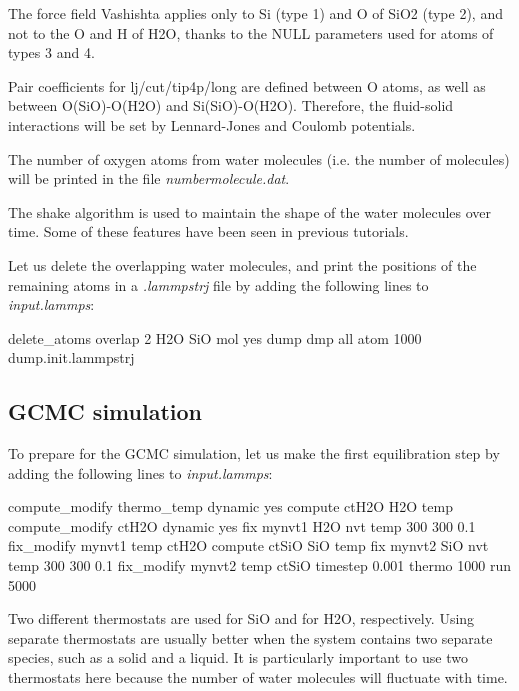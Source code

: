 \noindent The force field Vashishta applies only to Si (type 1)
and O of SiO2 (type 2),
and not to the O and H of H2O, thanks to the NULL
parameters used for atoms of types 3 and 4. 

\vspace{0.25cm} \noindent Pair coefficients for lj/cut/tip4p/long are
defined between O atoms, as well as between
O(SiO)-O(H2O) and Si(SiO)-O(H2O). Therefore, the fluid-solid 
interactions will be set by Lennard-Jones and Coulomb potentials. 

\vspace{0.25cm} \noindent The number of oxygen atoms from water molecules (i.e. the number of molecules)
will be printed in the file \textit{numbermolecule.dat}.

\vspace{0.25cm} \noindent The shake algorithm is used to
maintain the shape of the water molecules over time. Some of
these features have been seen in previous tutorials.

\vspace{0.25cm} \noindent Let us delete the overlapping water molecules, and print the
positions of the remaining atoms in a \textit{.lammpstrj} file by adding the following
lines to \textit{input.lammps}:

\begin{lcverbatim}
delete_atoms overlap 2 H2O SiO mol yes
dump dmp all atom 1000 dump.init.lammpstrj
\end{lcverbatim}

\subsection{GCMC simulation}
To prepare for the GCMC simulation,
let us make the first equilibration step
by adding the following lines to \textit{input.lammps}:

\begin{lcverbatim}
compute_modify thermo_temp dynamic yes
compute ctH2O H2O temp
compute_modify ctH2O dynamic yes
fix mynvt1 H2O nvt temp 300 300 0.1
fix_modify mynvt1 temp ctH2O
compute ctSiO SiO temp
fix mynvt2 SiO nvt temp 300 300 0.1
fix_modify mynvt2 temp ctSiO
timestep 0.001
thermo 1000
run 5000
\end{lcverbatim}

\noindent \begin{tcolorbox}[colback=mylightblue!5!white,colframe=mylightblue!75!black,title=On thermostating groups instead of the entire system]

\vspace{0.25cm} \noindent Two different thermostats are used for SiO and for H2O, respectively. Using 
separate thermostats are usually better when the system contains two separate
species, such as a solid and a
liquid. It is particularly important to use two thermostats
here because the number of water molecules will fluctuate with time.
\end{tcolorbox}


